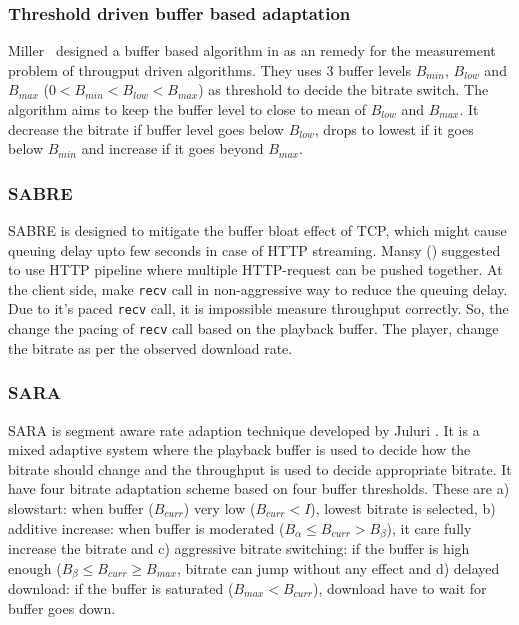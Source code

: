 \subsubsection{Threshold driven buffer based adaptation\cite{6229732}}
Miller \etal\ designed a buffer based algorithm in \cite{6229732} as an remedy for the measurement problem of througput driven algorithms. They uses 3 buffer levels $B_{min}$, $B_{low}$ and $B_{max}$ ($0 < B_{min} < B_{low} < B_{max}$) as threshold to decide the bitrate switch. The algorithm aims to keep the buffer level to close to mean of $B_{low}$ and $B_{max}$. It decrease the bitrate if buffer level goes below $B_{low}$, drops to lowest if it goes below $B_{min}$ and increase if it goes beyond $B_{max}$.

\subsubsection{SABRE\cite{10.1145/2483977.2484004}}
SABRE is designed to mitigate the buffer bloat effect of TCP, which might cause queuing delay upto few seconds in case of HTTP streaming. Mansy \etal(\cite{10.1145/2483977.2484004}) suggested to use HTTP pipeline where multiple HTTP-request can be pushed together. At the client side, make {\tt recv} call in non-aggressive way to reduce the queuing delay. Due to it's paced {\tt recv} call, it is impossible measure throughput correctly. So, the change the pacing of {\tt recv} call based on the playback buffer. The player, change the bitrate as per the observed download rate.

\subsubsection{SARA\cite{7247436}}
SARA\cite{7247436} is segment aware rate adaption technique developed by Juluri \etal. It is a mixed adaptive system where the playback buffer is used to decide how the bitrate should change and the throughput is used to decide appropriate bitrate. It have four bitrate adaptation scheme based on four buffer thresholds. These are a) slowstart: when buffer ($B_{curr}$) very low ($B_{curr}<I$), lowest bitrate is selected, b) additive increase: when buffer is moderated ($B_{\alpha} \le B_{curr} > B_{\beta}$), it care fully increase the bitrate and c) aggressive bitrate switching: if the buffer is high enough ($B_{\beta} \le B_{curr} \ge B_{max}$, bitrate can jump without any effect and d) delayed download: if the buffer is saturated ($B_{max} < B_{curr}$), download have to wait for buffer goes down.

